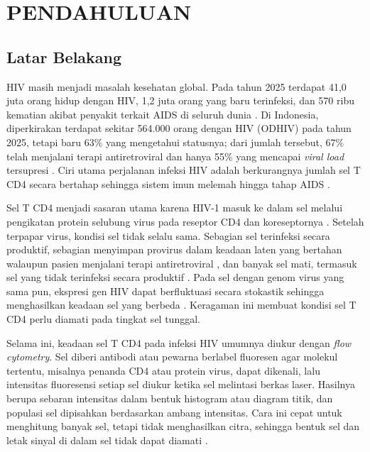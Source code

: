 \chapter{PENDAHULUAN}\label{pendahuluan}

\section{Latar Belakang}\label{latar-belakang}

HIV masih menjadi masalah kesehatan global. Pada tahun 2025 terdapat 41,0 juta orang hidup dengan HIV, 1,2 juta orang yang baru terinfeksi, dan 570 ribu kematian akibat penyakit terkait AIDS di seluruh dunia \cite{unaids2026factsheet}. Di Indonesia, diperkirakan terdapat sekitar 564.000 orang dengan HIV (ODHIV) pada tahun 2025, tetapi baru 63\% yang mengetahui statusnya; dari jumlah tersebut, 67\% telah menjalani terapi antiretroviral dan hanya 55\% yang mencapai \textit{viral load} tersupresi \cite{kemenkes2025hiv}. Ciri utama perjalanan infeksi HIV adalah berkurangnya jumlah sel T CD4 secara bertahap sehingga sistem imun melemah hingga tahap AIDS \cite{deeks2015hiv}.

Sel T CD4 menjadi sasaran utama karena HIV-1 masuk ke dalam sel melalui pengikatan protein selubung virus pada reseptor CD4 dan koreseptornya \cite{engelman2012structural}. Setelah terpapar virus, kondisi sel tidak selalu sama. Sebagian sel terinfeksi secara produktif, sebagian menyimpan provirus dalam keadaan laten yang bertahan walaupun pasien menjalani terapi antiretroviral \cite{finzi1997reservoir,siliciano2011latency}, dan banyak sel mati, termasuk sel yang tidak terinfeksi secara produktif \cite{doitsh2014pyroptosis,cummins2010apoptosis}. Pada sel dengan genom virus yang sama pun, ekspresi gen HIV dapat berfluktuasi secara stokastik sehingga menghasilkan keadaan sel yang berbeda \cite{weinberger2005stochastic}. Keragaman ini membuat kondisi sel T CD4 perlu diamati pada tingkat sel tunggal.

Selama ini, keadaan sel T CD4 pada infeksi HIV umumnya diukur dengan \textit{flow cytometry}. Sel diberi antibodi atau pewarna berlabel fluoresen agar molekul tertentu, misalnya penanda CD4 atau protein virus, dapat dikenali, lalu intensitas fluoresensi setiap sel diukur ketika sel melintasi berkas laser. Hasilnya berupa sebaran intensitas dalam bentuk histogram atau diagram titik, dan populasi sel dipisahkan berdasarkan ambang intensitas. Cara ini cepat untuk menghitung banyak sel, tetapi tidak menghasilkan citra, sehingga bentuk sel dan letak sinyal di dalam sel tidak dapat diamati \cite{basiji2007ifc,barteneva2012ifc}.

